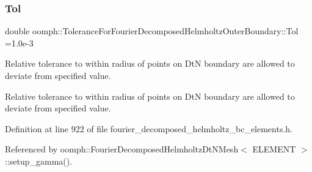 \subsubsection{\texorpdfstring{Tol}{Tol}}
{\footnotesize\ttfamily double oomph\+::\+Tolerance\+For\+Fourier\+Decomposed\+Helmholtz\+Outer\+Boundary\+::\+Tol =1.\+0e-\/3}



Relative tolerance to within radius of points on DtN boundary are allowed to deviate from specified value. 

Relative tolerance to within radius of points on DtN boundary are allowed to deviate from specified value. 

Definition at line 922 of file fourier\+\_\+decomposed\+\_\+helmholtz\+\_\+bc\+\_\+elements.\+h.



Referenced by oomph\+::\+Fourier\+Decomposed\+Helmholtz\+Dt\+N\+Mesh$<$ E\+L\+E\+M\+E\+N\+T $>$\+::setup\+\_\+gamma().

